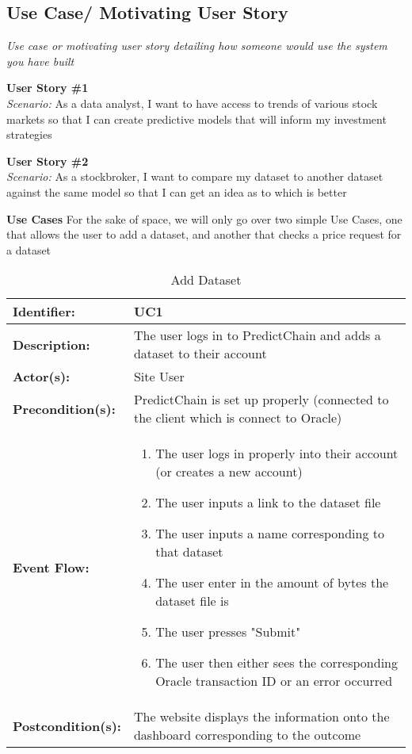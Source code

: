 \documentclass{article}
\begin{document}
\subsection{Use Case/ Motivating User Story}
\emph{Use case or motivating user story detailing how someone would use the system you have built}

\newline\quad\textbf{User Story \#1}
\\\textit{Scenario:} As a data analyst, I want to have access to trends of various stock markets so that I can create predictive models that will inform my investment strategies

\newline\quad\textbf{User Story \#2}
\\\textit{Scenario:} As a stockbroker, I want to compare my dataset to another dataset against the same model so that I can get an idea as to which is better


\newline\quad\textbf{Use Cases}
\newline For the sake of space, we will only go over two simple Use Cases, one that allows the user to add a dataset, and another that checks a price request for a dataset 
\begin{table}[H]
\caption{Add Dataset}
\label{tab:my-table}
\centering
\begin{tabular}{|p{3cm}|p{8cm}|}
\hline
\textbf{Identifier:} & UC1 \\
\hline
\textbf{Description:} & The user logs in to PredictChain and adds a dataset to their account\\
\hline
\textbf{Actor(s):} & Site User \\
\hline
\textbf{Precondition(s):} & PredictChain is set up properly (connected to the client which is connect to Oracle) \\
\hline
\textbf{Event Flow:} & 
\begin{enumerate}
    \item The user logs in properly into their account (or creates a new account)
    \item The user inputs a link to the dataset file 
    \item The user inputs a name corresponding to that dataset
    \item The user enter in the amount of bytes the dataset file is
    \item The user presses "Submit" 
    \item The user then either sees the corresponding Oracle transaction ID or an error occurred
\end{enumerate} \\
\hline
\textbf{Postcondition(s):} & The website displays the information onto the dashboard corresponding to the outcome \\
\hline
\end{tabular}
\end{table}
\end{document}
